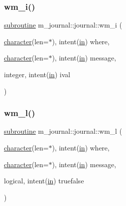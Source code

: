 \mbox{\label{interfacem__journal_1_1journal_a1d3160c8b7e0f8273fde1ac71b6b4dc7}} 
\subsubsection{\texorpdfstring{wm\+\_\+i()}{wm\_i()}}
{\footnotesize\ttfamily \hyperlink{M__stopwatch_83_8txt_acfbcff50169d691ff02d4a123ed70482}{subroutine} m\+\_\+journal\+::journal\+::wm\+\_\+i (\begin{DoxyParamCaption}\item[{\hyperlink{option__stopwatch_83_8txt_abd4b21fbbd175834027b5224bfe97e66}{character}(len=$\ast$), intent(\hyperlink{M__journal_83_8txt_afce72651d1eed785a2132bee863b2f38}{in})}]{where,  }\item[{\hyperlink{option__stopwatch_83_8txt_abd4b21fbbd175834027b5224bfe97e66}{character}(len=$\ast$), intent(\hyperlink{M__journal_83_8txt_afce72651d1eed785a2132bee863b2f38}{in})}]{message,  }\item[{integer, intent(\hyperlink{M__journal_83_8txt_afce72651d1eed785a2132bee863b2f38}{in})}]{ival }\end{DoxyParamCaption})\hspace{0.3cm}{\ttfamily [private]}}

\mbox{\label{interfacem__journal_1_1journal_a88c7dc90a1611f8ff74dcc76a7596d0f}} 
\subsubsection{\texorpdfstring{wm\+\_\+l()}{wm\_l()}}
{\footnotesize\ttfamily \hyperlink{M__stopwatch_83_8txt_acfbcff50169d691ff02d4a123ed70482}{subroutine} m\+\_\+journal\+::journal\+::wm\+\_\+l (\begin{DoxyParamCaption}\item[{\hyperlink{option__stopwatch_83_8txt_abd4b21fbbd175834027b5224bfe97e66}{character}(len=$\ast$), intent(\hyperlink{M__journal_83_8txt_afce72651d1eed785a2132bee863b2f38}{in})}]{where,  }\item[{\hyperlink{option__stopwatch_83_8txt_abd4b21fbbd175834027b5224bfe97e66}{character}(len=$\ast$), intent(\hyperlink{M__journal_83_8txt_afce72651d1eed785a2132bee863b2f38}{in})}]{message,  }\item[{logical, intent(\hyperlink{M__journal_83_8txt_afce72651d1eed785a2132bee863b2f38}{in})}]{truefalse }\end{DoxyParamCaption})\hspace{0.3cm}{\ttfamily [private]}}

